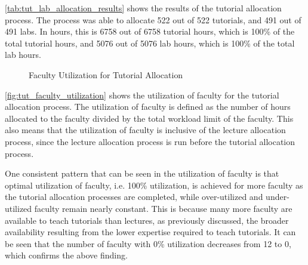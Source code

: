 \autoref{tab:tut_lab_allocation_results} shows the results of the tutorial allocation process. The process was able to allocate 522 out of 522 tutorials, and 491 out of 491 labs. In hours, this is 6758 out of 6758 tutorial hours, which is 100\% of the total tutorial hours, and 5076 out of 5076 lab hours, which is 100\% of the total lab hours.

\begin{figure}[H]
  \centering
  \caption{Faculty Utilization for Tutorial Allocation}
  \label{fig:tut_faculty_utilization}
\end{figure}

\autoref{fig:tut_faculty_utilization} shows the utilization of faculty for the tutorial allocation process. The utilization of faculty is defined as the number of hours allocated to the faculty divided by the total workload limit of the faculty. This also means that the utilization of faculty is inclusive of the lecture allocation process, since the lecture allocation process is run before the tutorial allocation process.

One consistent pattern that can be seen in the utilization of faculty is that optimal utilization of faculty, i.e. 100\% utilization, is achieved for more faculty as the tutorial allocation processes are completed, while over-utilized and under-utilized faculty remain nearly constant. This is because many more faculty are available to teach tutorials than lectures, as previously discussed, the broader availability resulting from the lower expertise required to teach tutorials. It can be seen that the number of faculty with 0\% utilization decreases from 12 to 0, which confirms the above finding.

